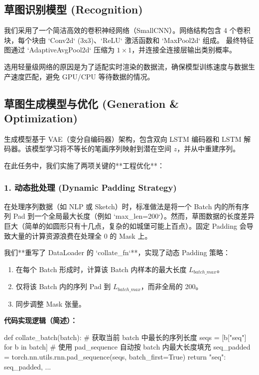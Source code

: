 \documentclass{sjtuarticle}
\begin{document}
\subsection{草图识别模型 (Recognition)}
我们采用了一个简洁高效的卷积神经网络（SmallCNN）。网络结构包含 4 个卷积块，每个块由 `Conv2d` (3x3)、`ReLU` 激活函数和 `MaxPool2d` 组成。
最终特征图通过 `AdaptiveAvgPool2d` 压缩为 $1 \times 1$，并连接全连接层输出类别概率。

选用轻量级网络的原因是为了适配实时渲染的数据流，确保模型训练速度与数据生产速度匹配，避免 GPU/CPU 等待数据的情况。

\subsection{草图生成模型与优化 (Generation \& Optimization)}
生成模型基于 VAE（变分自编码器）架构，包含双向 LSTM 编码器和 LSTM 解码器。该模型学习将不等长的笔画序列映射到潜在空间 $z$，并从中重建序列。

在此任务中，我们实施了两项关键的**工程优化**：

\subsubsection{1. 动态批处理 (Dynamic Padding Strategy)}
在处理序列数据（如 NLP 或 Sketch）时，标准做法是将一个 Batch 内的所有序列 Pad 到一个全局最大长度（例如 `max_len=200`）。然而，草图数据的长度差异巨大（简单的如圆形只有十几点，复杂的如城堡可能上百点）。固定 Padding 会导致大量的计算资源浪费在处理全 0 的 Mask 上。

我们**重写了 DataLoader 的 `collate_fn`**，实现了动态 Padding 策略：
\begin{enumerate}
    \item 在每个 Batch 形成时，计算该 Batch 内样本的最大长度 $L_{batch\_max}$。
    \item 仅将该 Batch 内的序列 Pad 到 $L_{batch\_max}$，而非全局的 200。
    \item 同步调整 Mask 张量。
\end{enumerate}

\textbf{代码实现逻辑（简述）：}
\begin{codeblock}[language=Python]
def collate_batch(batch):
    # 获取当前 batch 中最长的序列长度
    seqs = [b["seq"] for b in batch]
    # 使用 pad_sequence 自动按 batch 内最大长度填充
    seq_padded = torch.nn.utils.rnn.pad_sequence(seqs, batch_first=True)
    return {"seq": seq_padded, ...}
\end{codeblock}
\end{document}
